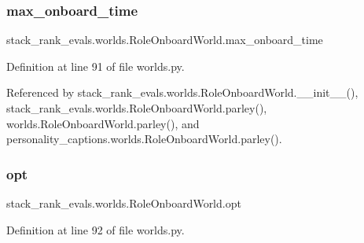 \subsubsection{\texorpdfstring{max\+\_\+onboard\+\_\+time}{max\_onboard\_time}}
{\footnotesize\ttfamily stack\+\_\+rank\+\_\+evals.\+worlds.\+Role\+Onboard\+World.\+max\+\_\+onboard\+\_\+time}



Definition at line 91 of file worlds.\+py.



Referenced by stack\+\_\+rank\+\_\+evals.\+worlds.\+Role\+Onboard\+World.\+\_\+\+\_\+init\+\_\+\+\_\+(), stack\+\_\+rank\+\_\+evals.\+worlds.\+Role\+Onboard\+World.\+parley(), worlds.\+Role\+Onboard\+World.\+parley(), and personality\+\_\+captions.\+worlds.\+Role\+Onboard\+World.\+parley().

\mbox{\label{classstack__rank__evals_1_1worlds_1_1RoleOnboardWorld_a986c8464db53b9d32da815609b44392d}} 
\subsubsection{\texorpdfstring{opt}{opt}}
{\footnotesize\ttfamily stack\+\_\+rank\+\_\+evals.\+worlds.\+Role\+Onboard\+World.\+opt}



Definition at line 92 of file worlds.\+py.



